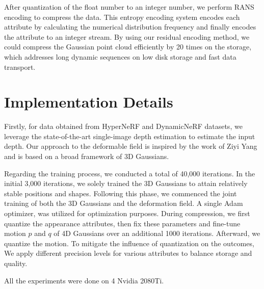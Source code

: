 After quantization of the float number to an integer number, we perform RANS encoding to compress the data. This entropy encoding system encodes each attribute by calculating the numerical distribution frequency and finally encodes the attribute to an integer stream. 
By using our residual encoding method, we could compress the Gaussian point cloud efficiently by 20 times on the storage, which addresses long dynamic sequences on low disk storage and fast data transport. 

\section{Implementation Details}\label{sec:detail} 

Firstly, for data obtained from HyperNeRF\cite{park2021hypernerf} and DynamicNeRF\cite{gao2021dynamic} datasets, we leverage the state-of-the-art single-image depth estimation\cite{Ranftl2022} to estimate the input depth. Our approach to the deformable field is inspired by the work of Ziyi Yang\cite{yang2023deformable3dgs} and is based on a broad framework of 3D Gaussians\cite{kerbl3Dgaussians}.

Regarding the training process, we conducted a total of 40,000 iterations. In the initial 3,000 iterations, we solely trained the 3D Gaussians to attain relatively stable positions and shapes. Following this phase, we commenced the joint training of both the 3D Gaussians and the deformation field. A single Adam optimizer\cite{kingma2017adam}, was utilized for optimization purposes.
During compression, we first quantize the appearance attributes, then fix these parameters and fine-tune motion $p$ and $q$ of 4D Gaussians over an additional 1000 iterations. Afterward, we quantize the motion. To mitigate the influence of quantization on the outcomes, We apply different precision levels for various attributes to balance storage and quality.

All the experiments were done on 4 Nvidia 2080Ti.


